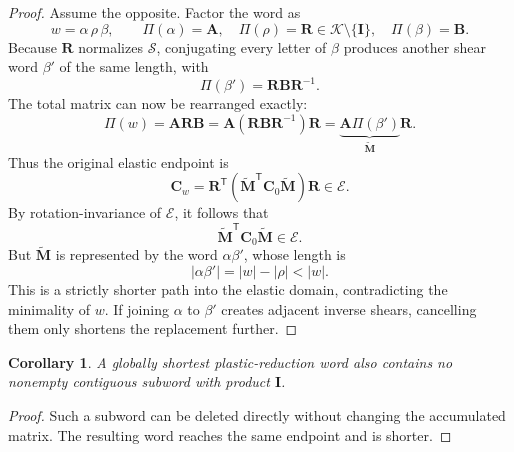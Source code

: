 \documentclass[11pt]{article}
\newcommand{\trans}{\mathsf{T}}
\newcommand{\E}{\mathcal E}
\newcommand{\K}{\mathcal K}
\newcommand{\Sset}{\mathcal S}
\newcommand{\wordprod}{\Pi}
\newtheorem{corollary}{Corollary}
\theoremstyle{definition}
\begin{document}
\begin{proof}
Assume the opposite.  Factor the word as
\begin{equation}
 w=\alpha\,\rho\,\beta,
 \qquad
 \wordprod(\alpha)=\mathbf A,
 \quad \wordprod(\rho)=\mathbf R\in\K\setminus\{\mathbf I\},
 \quad \wordprod(\beta)=\mathbf B.
\end{equation}
Because \(\mathbf R\) normalizes \(\Sset\), conjugating every letter of
\(\beta\) produces another shear word \(\beta'\) of the same length, with
\begin{equation}
 \wordprod(\beta')=\mathbf R\mathbf B\mathbf R^{-1}.
 \label{eq:conjugatedsuffix}
\end{equation}
The total matrix can now be rearranged exactly:
\begin{equation}
 \wordprod(w)=\mathbf A\mathbf R\mathbf B
 =\mathbf A(\mathbf R\mathbf B\mathbf R^{-1})\mathbf R
 =\underbrace{\mathbf A\wordprod(\beta')}_{\widetilde{\mathbf M}}
  \mathbf R.
 \label{eq:pushrotation}
\end{equation}
Thus the original elastic endpoint is
\begin{equation}
 \mathbf C_w
 =\mathbf R^\trans
  (\widetilde{\mathbf M}^\trans\mathbf C_0\widetilde{\mathbf M})
  \mathbf R\in\E.
\end{equation}
By rotation-invariance of \(\E\), it follows that
\begin{equation}
 \widetilde{\mathbf M}^\trans\mathbf C_0\widetilde{\mathbf M}\in\E.
\end{equation}
But \(\widetilde{\mathbf M}\) is represented by the word
\(\alpha\beta'\), whose length is
\begin{equation}
 |\alpha\beta'|=|w|-|\rho|<|w|.
\end{equation}
This is a strictly shorter path into the elastic domain, contradicting the
minimality of \(w\).  If joining \(\alpha\) to \(\beta'\) creates adjacent
inverse shears, cancelling them only shortens the replacement further.
\end{proof}

\begin{corollary}
A globally shortest plastic-reduction word also contains no nonempty contiguous
subword with product \(\mathbf I\).
\end{corollary}

\begin{proof}
Such a subword can be deleted directly without changing the accumulated
matrix.  The resulting word reaches the same endpoint and is shorter.
\end{proof}
\end{document}
